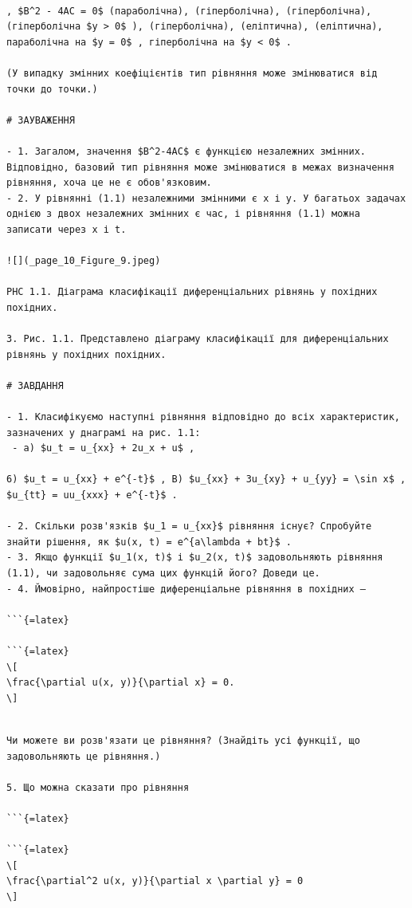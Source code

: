 \documentclass[
  ukrainian,
]{article}
\begin{document}
\begin{verbatim}

, $B^2 - 4AC = 0$ (параболічна), (гіперболічна), (гіперболічна), (гіперболічна $y > 0$ ), (гіперболічна), (еліптична), (еліптична), параболічна на $y = 0$ , гіперболічна на $y < 0$ .

(У випадку змінних коефіцієнтів тип рівняння може змінюватися від точки до точки.)

# ЗАУВАЖЕННЯ

- 1. Загалом, значення $B^2-4AC$ є функцією незалежних змінних. Відповідно, базовий тип рівняння може змінюватися в межах визначення рівняння, хоча це не є обов'язковим.
- 2. У рівнянні (1.1) незалежними змінними є x і y. У багатьох задачах однією з двох незалежних змінних є час, і рівняння (1.1) можна записати через x і t.

![](_page_10_Figure_9.jpeg)

PHC 1.1. Діаграма класифікації диференціальних рівнянь у похідних похідних.

3. Рис. 1.1. Представлено діаграму класифікації для диференціальних рівнянь у похідних похідних.

# ЗАВДАННЯ

- 1. Класифікуємо наступні рівняння відповідно до всіх характеристик, зазначених у днаграмі на рис. 1.1:
 - a) $u_t = u_{xx} + 2u_x + u$ ,

6) $u_t = u_{xx} + e^{-t}$ , B) $u_{xx} + 3u_{xy} + u_{yy} = \sin x$ , $u_{tt} = uu_{xxx} + e^{-t}$ .

- 2. Скільки розв'язків $u_1 = u_{xx}$ рівняння існує? Спробуйте знайти рішення, як $u(x, t) = e^{a\lambda + bt}$ .
- 3. Якщо функції $u_1(x, t)$ і $u_2(x, t)$ задовольняють рівняння (1.1), чи задовольняє сума цих функцій його? Доведи це.
- 4. Ймовірно, найпростіше диференціальне рівняння в похідних —

```{=latex}

```{=latex}
\[
\frac{\partial u(x, y)}{\partial x} = 0.
\]
\end{verbatim}

\begin{verbatim}

Чи можете ви розв'язати це рівняння? (Знайдіть усі функції, що задовольняють це рівняння.)

5. Що можна сказати про рівняння

```{=latex}

```{=latex}
\[
\frac{\partial^2 u(x, y)}{\partial x \partial y} = 0
\]
\end{verbatim}
\end{document}
